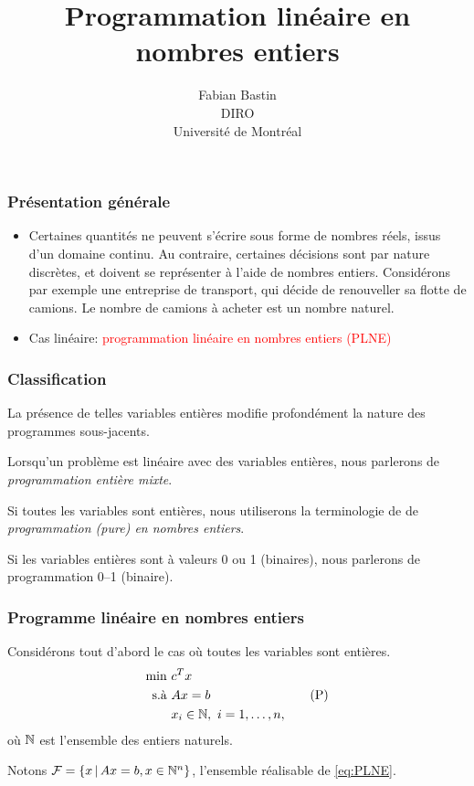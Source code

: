 \documentclass[usepdftitle=false, aspectratio=169]{beamer}
\title[PLNE]{Programmation linéaire en nombres entiers}
\author[Fabian Bastin]{Fabian Bastin\\DIRO\\Université de Montréal\\\mbox{}}
\date{}
\def\cF{\mathcal{F}}
\begin{document}
\frame{\titlepage}

\begin{frame}
\frametitle{Présentation générale}

\begin{itemize}
\item 
Certaines quantités ne peuvent s'écrire sous forme de nombres réels, issus d'un domaine continu. Au contraire, certaines décisions sont par nature discrètes, et doivent se représenter à l'aide de nombres entiers.
Considérons par exemple une entreprise de transport, qui décide de renouveller sa flotte de camions.
Le nombre de camions à acheter est un nombre naturel.
\item 
Cas linéaire: \textcolor{red}{programmation linéaire en nombres entiers (PLNE)}
\end{itemize}



\end{frame}

\begin{frame}
\frametitle{Classification}

La présence de telles variables entières modifie profondément la nature des programmes sous-jacents.

\mbox{}

Lorsqu'un problème est linéaire avec des variables entières, nous parlerons de {\sl programmation entière mixte}.

\mbox{}

Si toutes les variables sont entières, nous utiliserons la terminologie de de {\sl programmation (pure) en nombres entiers}.

\mbox{}

Si les variables entières sont à valeurs 0 ou 1 (binaires), nous parlerons de programmation 0--1 (binaire).

\end{frame}

\begin{frame}
\frametitle{Programme linéaire en nombres entiers}

Considérons tout d'abord le cas où toutes les variables sont entières.
\begin{equation}
\begin{aligned}
\min\ & c^Tx \\
\mbox{s.à } & Ax = b \\
& x_i \in {\mathbb{N}},\ i = 1,\ldots,n,
\end{aligned}
\tag{P}
\label{eq:PLNE}
\end{equation}
où ${\mathbb{N}}$ est l'ensemble des entiers naturels.

\mbox{}

Notons $\cF = \{ x \,|\, Ax = b, x \in \NN^n \}$,
l'ensemble réalisable de \eqref{eq:PLNE}.

\end{frame}
\end{document}
